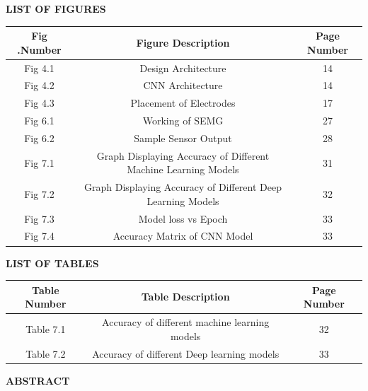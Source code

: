 \documentclass[ 12pt,a4paper,twocolumn,fleqn]{report}
\begin{document}
\newpage
  \pagestyle{fancy}
\thisfancypage{%
  \setlength{\fboxsep}{20pt}\doublebox}{}
\begin{center}
\huge\textbf{LIST OF FIGURES}
\end{center}
\vspace{15mm}
\begin{center}
    \begin{tabular}{|c|c|c|}
     \hline
     Fig .Number & Figure Description & Page Number \\
     \hline
     Fig 4.1 &Design Architecture & 14 \\
     \hline
     Fig 4.2 &CNN Architecture& 14 \\
     \hline
     Fig 4.3 &Placement of Electrodes& 17\\
     \hline
     Fig 6.1  &Working of SEMG& 27\\
     \hline
      Fig 6.2  &Sample Sensor Output& 28\\
     \hline
     Fig 7.1 &Graph Displaying Accuracy of Different Machine Learning Models & 31 \\
     \hline
     Fig 7.2& Graph Displaying Accuracy of Different Deep Learning Models
&32 \\
     \hline
     Fig 7.3 &Model loss vs Epoch & 33 \\
     \hline
     Fig 7.4& Accuracy Matrix of CNN Model & 33\\
     \hline
    \end{tabular}
\end{center}

\newpage
  \pagestyle{fancy}
\thisfancypage{%
  \setlength{\fboxsep}{20pt}\doublebox}{}
\begin{center}
\huge\textbf{LIST OF TABLES}
\end{center}
\vspace{15mm}
\begin{center}
    \begin{tabular}{|c|c|c|}
     \hline
     Table Number &Table Description &Page Number \\
     \hline
     Table 7.1 &Accuracy of different machine learning
models
& 32 \\
     \hline
     Table 7.2 &Accuracy of different Deep learning
models
& 33 \\
     \hline
    \end{tabular}
\end{center}

\newpage
  \pagestyle{fancy}
\thisfancypage{%
  \setlength{\fboxsep}{20pt}\doublebox}{}
\begin{center}
    \huge\textbf{ABSTRACT}
\end{center}
\vspace{15mm}
\end{document}

